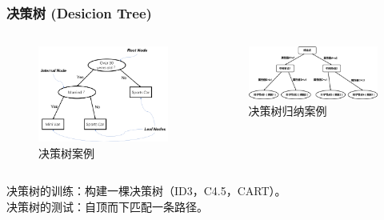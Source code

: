 \documentclass[10pt,aspectratio=43,mathserif]{beamer}
\begin{document}
        \begin{frame}
		  \frametitle{\textbf{决策树 (Desicion Tree)}}
            \begin{columns}
                \footnotesize
                \begin{figure}[!t]
                    \centering
                    \includegraphics[width=1.1\textwidth]{figures/dt_eg.png}
                    \caption{决策树案例}
                    \label{figure3_OTT}
                \end{figure}

                \begin{figure}[!t]
                    \centering
                    \includegraphics[width=1.1\textwidth]{figures/dt_general.png}
                    \caption{决策树归纳案例}
                    \label{figure3_OTT}
                \end{figure}
            \end{columns}
            决策树的训练：构建一棵决策树（ID3，C4.5，CART）。\\
            决策树的测试：自顶而下匹配一条路径。
        \end{frame}
        
\end{document}
